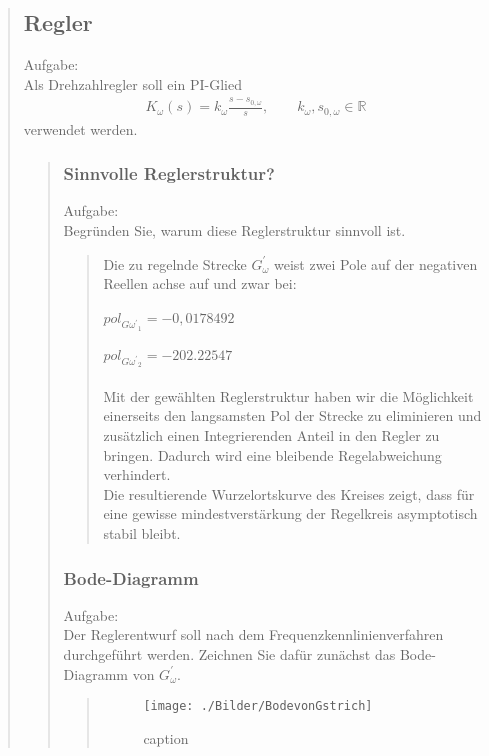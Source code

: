 \begin{quote}
\begin{quote}
        
	\end{quote}
	
	\subsection{Regler}
    Aufgabe:\\
    Als Drehzahlregler soll ein PI-Glied\\
    \begin{equation*}
        \begin{split}
            K_\omega (s) = k_\omega \frac{s-s_{0,\omega}}{s}, \hspace{2em} k_\omega, s_{0,\omega} \in \mathbb{R}
        \end{split}
    \end{equation*}
    verwendet werden.
	\begin{quote}
		
		\subsubsection{Sinnvolle Reglerstruktur?}
        Aufgabe:\\
        Begründen Sie, warum diese Reglerstruktur sinnvoll ist.\\
		\begin{quote}
			Die zu regelnde Strecke $G_\omega^{'}$ weist zwei Pole auf der negativen Reellen achse auf und zwar bei:\\
            \\
			$pol_{G\omega^{'}}_1 = - 0,0178492$\\
			\\
			$pol_{G\omega^{'}}_2 = - 202.22547$\\
			\\
			Mit der gewählten Reglerstruktur haben wir die Möglichkeit einerseits den langsamsten Pol der Strecke zu eliminieren
			und zusätzlich einen Integrierenden Anteil in den Regler zu bringen. Dadurch wird eine bleibende Regelabweichung
			verhindert.\\
			Die resultierende Wurzelortskurve des Kreises zeigt, dass für eine gewisse mindestverstärkung der Regelkreis
			asymptotisch stabil bleibt.
		\end{quote}
		
		\subsubsection{Bode-Diagramm}
        Aufgabe:\\
        Der Reglerentwurf soll nach dem Frequenzkennlinienverfahren durchgeführt werden. Zeichnen Sie dafür zunächst
        das Bode-Diagramm von $G_\omega^{'}$.\\   
        \begin{quote}
            \begin{figure}[H]
            \centering
                \texttt{[image: ./Bilder/BodevonGstrich]}
                    \caption{caption}
                    \label{fig:BodevonGstrich}
            \end{figure}
       

\end{quote}
\end{quote}
\end{quote}
